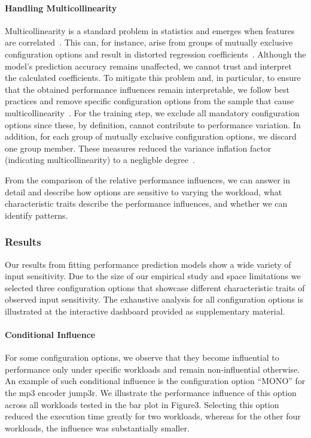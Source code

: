 {{\paragraph*{Handling Multicollinearity} Multicollinearity is a standard problem in statistics and emerges when features are correlated~\cite{Daoud_2017}. This can, for instance, arise from groups of mutually exclusive configuration options and result in distorted regression coefficients~\cite{dorn2020}. Although the model's prediction accuracy remains unaffected, we cannot trust and interpret the calculated coefficients. To mitigate this problem and, in particular, to ensure that the obtained performance influences remain interpretable, we follow best practices and remove specific configuration options from the sample that cause multicollinearity~\cite{dorn2020}. For the training step, we exclude all mandatory configuration options since these, by definition, cannot contribute to performance variation. In addition, for each group of mutually exclusive configuration options, we discard one group member. These measures reduced the variance inflation factor (indicating multicollinearity) to a negligble degree~\cite{o2007caution}.

From the comparison of the relative performance influences, we can answer  in detail and describe how options are sensitive to varying the workload, what characteristic traits describe the performance influences, and whether we can identify patterns.

\subsubsection{Results}\label{sec:results2}
{\color{edited}
Our results from fitting performance prediction models show a wide variety of input sensitivity. Due to the size of our empirical study and space limitations we selected three configuration options that showcase different characteristic traits of observed input sensitivity. The exhaustive analysis for all configuration options is illustrated at the interactive dashboard provided as supplementary material.

\paragraph{Conditional Influence} For some configuration options, we observe that they become influential to performance only under specific workloads and remain non-influential otherwise. An example of such conditional influence is the configuration option “MONO” for the mp3 encoder jump3r. We illustrate the performance influence of this option across all workloads tested in the bar plot in Figure3. Selecting this option reduced the execution time greatly for two workloads, whereas for the other four workloads, the influence  was substantially smaller.

}}}
